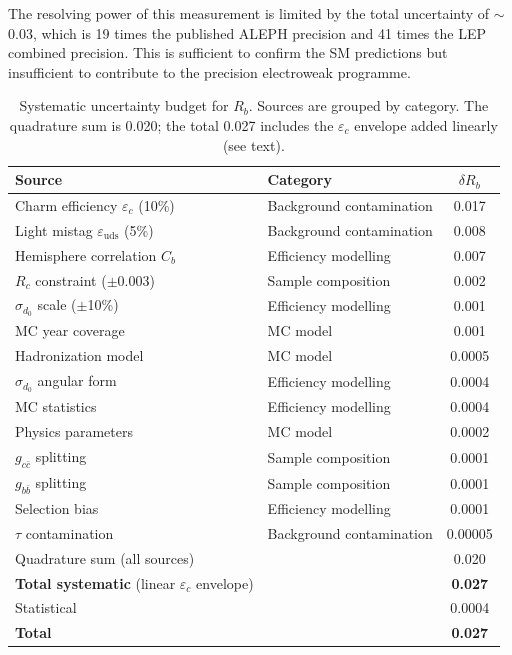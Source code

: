 \documentclass[11pt,a4paper]{article}
\begin{document}
The resolving power of this measurement is limited by the total
uncertainty of $\sim$0.03, which is 19 times the published ALEPH
precision and 41 times the LEP combined precision.  This is sufficient
to confirm the SM predictions but insufficient to contribute to the
precision electroweak programme.

\begin{table}[htbp]
\centering
\caption{Systematic uncertainty budget for $R_b$.  Sources are grouped
  by category.  The quadrature sum is 0.020; the total 0.027 includes
  the $\varepsilon_c$ envelope added linearly (see text).}
\label{tbl:syst-rb}
\begin{tabular}{llc}
\toprule
Source & Category & $\delta R_b$ \\
\midrule
Charm efficiency $\varepsilon_c$ (10\%) & Background contamination & 0.017 \\
Light mistag $\varepsilon_\mathrm{uds}$ (5\%) & Background contamination & 0.008 \\
Hemisphere correlation $C_b$ & Efficiency modelling & 0.007 \\
$R_c$ constraint ($\pm 0.003$) & Sample composition & 0.002 \\
$\sigma_{d_0}$ scale ($\pm$10\%) & Efficiency modelling & 0.001 \\
MC year coverage & MC model & 0.001 \\
Hadronization model & MC model & 0.0005 \\
$\sigma_{d_0}$ angular form & Efficiency modelling & 0.0004 \\
MC statistics & Efficiency modelling & 0.0004 \\
Physics parameters & MC model & 0.0002 \\
$g_{c\bar{c}}$ splitting & Sample composition & 0.0001 \\
$g_{b\bar{b}}$ splitting & Sample composition & 0.0001 \\
Selection bias & Efficiency modelling & 0.0001 \\
$\tau$ contamination & Background contamination & 0.00005 \\
\midrule
Quadrature sum (all sources) & & 0.020 \\
\textbf{Total systematic} (linear $\varepsilon_c$ envelope) & & \textbf{0.027} \\
Statistical & & 0.0004 \\
\midrule
\textbf{Total} & & \textbf{0.027} \\
\bottomrule
\end{tabular}
\end{table}
\end{document}
